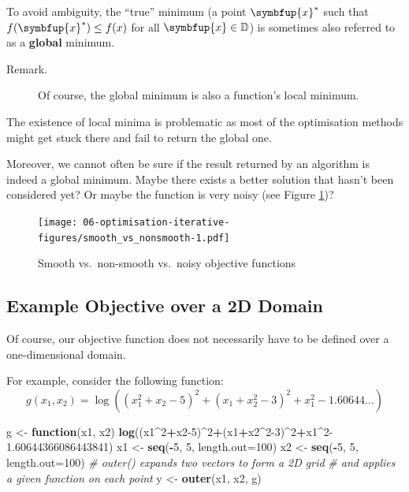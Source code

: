 \documentclass[10pt,b5paper,krantz1]{krantz}
\newenvironment{Shaded}{\begin{snugshade}}{\end{snugshade}}
\newcommand{\CommentTok}[1]{\textcolor[rgb]{0.37,0.37,0.37}{\textit{#1}}}
\newcommand{\ControlFlowTok}[1]{\textcolor[rgb]{0.27,0.27,0.27}{\textbf{#1}}}
\newcommand{\DataTypeTok}[1]{\textcolor[rgb]{0.27,0.27,0.27}{#1}}
\newcommand{\DecValTok}[1]{\textcolor[rgb]{0.06,0.06,0.06}{#1}}
\newcommand{\FloatTok}[1]{\textcolor[rgb]{0.06,0.06,0.06}{#1}}
\newcommand{\KeywordTok}[1]{\textcolor[rgb]{0.27,0.27,0.27}{\textbf{#1}}}
\newcommand{\NormalTok}[1]{#1}
\newcommand{\OperatorTok}[1]{\textcolor[rgb]{0.43,0.43,0.43}{\textbf{#1}}}
\newcommand{\StringTok}[1]{\textcolor[rgb]{0.5,0.5,0.5}{#1}}
\renewcommand{\mathbf}[1]{\symbfup{#1}}
\begin{document}
To avoid ambiguity, the ``true'' minimum (a point \(\mathbf{x}^*\) such that
\(f(\mathbf{x}^*)\le f({x})\) for all \(\mathbf{x}\in \mathbb{D}\))
is sometimes also referred to as
a \textbf{global} minimum.

\begin{description}
\item[Remark.]
Of course, the global minimum is also a function's local minimum.
\end{description}

The existence of local minima is problematic
as most of the optimisation methods might get stuck there
and fail to return the global one.

Moreover, we cannot often be sure if the result returned by an algorithm
is indeed a global minimum. Maybe there exists a better solution
that hasn't been considered yet? Or maybe the function
is very noisy (see Figure \ref{fig:smooth_vs_nonsmooth})?

\begin{figure}
\hypertarget{fig:smooth_vs_nonsmooth}{%
\centering
\texttt{[image: 06-optimisation-iterative-figures/smooth\_vs\_nonsmooth-1.pdf]}
\caption{Smooth vs.~non-smooth vs.~noisy objective functions}\label{fig:smooth_vs_nonsmooth}
}
\end{figure}

\clearpage

\hypertarget{example-objective-over-a-2d-domain}{%
\subsection{Example Objective over a 2D Domain}\label{example-objective-over-a-2d-domain}}

Of course, our objective function does not necessarily have to be defined
over a one-dimensional domain.

For example, consider the following function:
\[
g(x_1,x_2)=\log\left((x_1^{2}+x_2-5)^{2}+(x_1+x_2^{2}-3)^{2}+x_1^2-1.60644\dots\right)
\]

\begin{Shaded}
\begin{Highlighting}[]
\NormalTok{g  <-}\StringTok{ }\ControlFlowTok{function}\NormalTok{(x1, x2)}
    \KeywordTok{log}\NormalTok{((x1}\OperatorTok{^}\DecValTok{2}\OperatorTok{+}\NormalTok{x2}\DecValTok{-5}\NormalTok{)}\OperatorTok{^}\DecValTok{2}\OperatorTok{+}\NormalTok{(x1}\OperatorTok{+}\NormalTok{x2}\OperatorTok{^}\DecValTok{2-3}\NormalTok{)}\OperatorTok{^}\DecValTok{2}\OperatorTok{+}\NormalTok{x1}\OperatorTok{^}\DecValTok{2}\FloatTok{-1.60644366086443841}\NormalTok{)}
\NormalTok{x1 <-}\StringTok{ }\KeywordTok{seq}\NormalTok{(}\OperatorTok{-}\DecValTok{5}\NormalTok{, }\DecValTok{5}\NormalTok{, }\DataTypeTok{length.out=}\DecValTok{100}\NormalTok{)}
\NormalTok{x2 <-}\StringTok{ }\KeywordTok{seq}\NormalTok{(}\OperatorTok{-}\DecValTok{5}\NormalTok{, }\DecValTok{5}\NormalTok{, }\DataTypeTok{length.out=}\DecValTok{100}\NormalTok{)}
\CommentTok{# outer() expands two vectors to form a 2D grid}
\CommentTok{# and applies a given function on each point}
\NormalTok{y  <-}\StringTok{ }\KeywordTok{outer}\NormalTok{(x1, x2, g)}
\end{Highlighting}
\end{Shaded}
\end{document}
